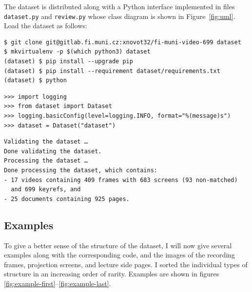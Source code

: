 The dataset is distributed along with a Python interface implemented in files
\texttt{dataset.py} and \texttt{review.py} whose class diagram is shown in
Figure~\ref{fig:uml}. Load the dataset as follows:
\begin{listings}
\begin{verbatim}
$ git clone git@gitlab.fi.muni.cz:xnovot32/fi-muni-video-699 dataset
$ mkvirtualenv -p $(which python3) dataset
(dataset) $ pip install --upgrade pip
(dataset) $ pip install --requirement dataset/requirements.txt
(dataset) $ python
\end{verbatim}
\begin{verbatim}
>>> import logging
>>> from dataset import Dataset
>>> logging.basicConfig(level=logging.INFO, format="%(message)s")
>>> dataset = Dataset("dataset")
\end{verbatim}
\begin{verbatim}
Validating the dataset …
Done validating the dataset.
Processing the dataset …
Done processing the dataset, which contains:
- 17 videos containing 409 frames with 683 screens (93 non-matched)
  and 699 keyrefs, and
- 25 documents containing 925 pages.
\end{verbatim}
\end{listings}

\subsection{Examples}
To give a better sense of the structure of the dataset, I will now give several
examples along with the corresponding  code, and the images of the
recording frames, projection screens, and lecture side pages. I sorted the
individual types of structure in an increasing order of rarity. Examples
are shown in figures \ref{fig:example-first}--\ref{fig:example-last}.

